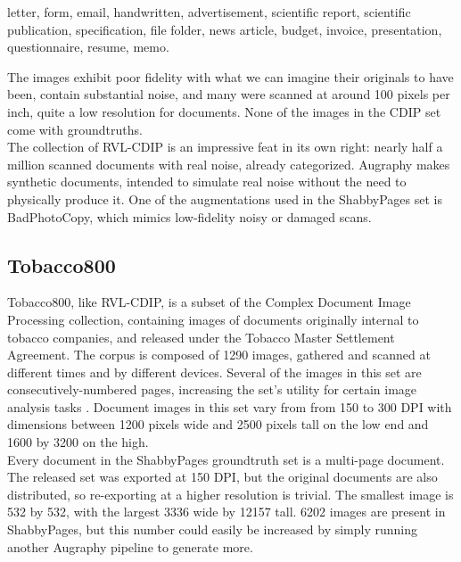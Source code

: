 \documentclass[runningheads]{llncs}
\begin{document}
\begin{center}
letter, form, email, handwritten, advertisement, scientific report,
scientific publication, specification, file folder, news article,
budget, invoice, presentation, questionnaire, resume, memo.
\end{center}

The images exhibit poor fidelity with what we can imagine their originals to have been, contain substantial noise, and many were scanned at around 100 pixels per inch, quite a low resolution for documents. None of the images in the CDIP set come with groundtruths.\\

The collection of RVL-CDIP is an impressive feat in its own right: nearly half a million scanned documents with real noise, already categorized. Augraphy makes synthetic documents, intended to simulate real noise without the need to physically produce it. One of the augmentations used in the ShabbyPages set is BadPhotoCopy, which mimics low-fidelity noisy or damaged scans.

\subsection{Tobacco800}
Tobacco800, like RVL-CDIP, is a subset of the Complex Document Image Processing collection, containing images of documents originally internal to tobacco companies, and released under the Tobacco Master Settlement Agreement. The corpus is composed of 1290 images, gathered and scanned at different times and by different devices. Several of the images in this set are consecutively-numbered pages, increasing the set's utility for certain image analysis tasks \cite{ref_Tobacco800}. Document images in this set vary from from 150 to 300 DPI with dimensions between 1200 pixels wide and 2500 pixels tall on the low end and 1600 by 3200 on the high.\\

Every document in the ShabbyPages groundtruth set is a multi-page document. The released set was exported at 150 DPI, but the original documents are also distributed, so re-exporting at a higher resolution is trivial. The smallest image is 532 by 532, with the largest 3336 wide by 12157 tall. 6202 images are present in ShabbyPages, but this number could easily be increased by simply running another Augraphy pipeline to generate more.
\end{document}
